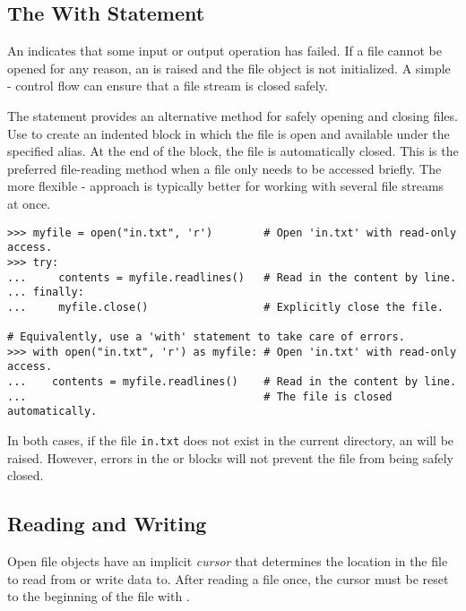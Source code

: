 \subsection*{The With Statement} %

An  indicates that some input or output operation has failed.
If a file cannot be opened for any reason, an  is raised and the file object is not initialized.
A simple - control flow can ensure that a file stream is closed safely.

The  statement provides an alternative method for safely opening and closing files.
Use  to create an indented block in which the file is open and available under the specified alias.
At the end of the block, the file is automatically closed.
This is the preferred file-reading method when a file only needs to be accessed briefly.
The more flexible - approach is typically better for working with several file streams at once.

\begin{lstlisting}
>>> myfile = open("in.txt", 'r')        # Open 'in.txt' with read-only access.
>>> try:
...     contents = myfile.readlines()   # Read in the content by line.
... finally:
...     myfile.close()                  # Explicitly close the file.

# Equivalently, use a 'with' statement to take care of errors.
>>> with open("in.txt", 'r') as myfile: # Open 'in.txt' with read-only access.
...    contents = myfile.readlines()    # Read in the content by line.
...                                     # The file is closed automatically.
\end{lstlisting}

In both cases, if the file \texttt{in.txt} does not exist in the current directory, an  will be raised.
However, errors in the  or  blocks will not prevent the file from being safely closed.

\subsection*{Reading and Writing} %

Open file objects have an implicit \emph{cursor} that determines the location in the file to read from or write data to.
After reading a file once, the cursor must be reset to the beginning of the file with .

